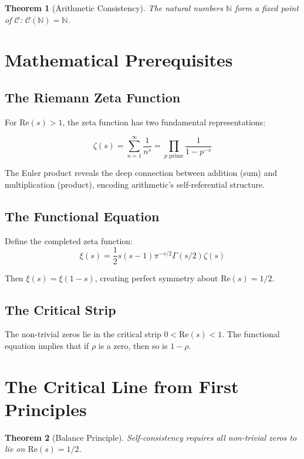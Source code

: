 \documentclass[12pt]{article}
\newtheorem{theorem}{Theorem}[section]
\newcommand{\N}{\mathbb{N}}
\begin{document}
\begin{theorem}[Arithmetic Consistency]
The natural numbers $\N$ form a fixed point of $\mathcal{C}$: $\mathcal{C}(\N) = \N$.
\end{theorem}

\section{Mathematical Prerequisites}

\subsection{The Riemann Zeta Function}

For $\text{Re}(s) > 1$, the zeta function has two fundamental representations:

\begin{equation}
\zeta(s) = \sum_{n=1}^{\infty} \frac{1}{n^s} = \prod_{p \text{ prime}} \frac{1}{1-p^{-s}}
\end{equation}

The Euler product reveals the deep connection between addition (sum) and multiplication (product), encoding arithmetic's self-referential structure.

\subsection{The Functional Equation}

Define the completed zeta function:
\begin{equation}
\xi(s) = \frac{1}{2}s(s-1)\pi^{-s/2}\Gamma(s/2)\zeta(s)
\end{equation}

Then $\xi(s) = \xi(1-s)$, creating perfect symmetry about $\text{Re}(s) = 1/2$.

\subsection{The Critical Strip}

The non-trivial zeros lie in the critical strip $0 < \text{Re}(s) < 1$. The functional equation implies that if $\rho$ is a zero, then so is $1-\rho$.

\section{The Critical Line from First Principles}

\begin{theorem}[Balance Principle]
Self-consistency requires all non-trivial zeros to lie on $\text{Re}(s) = 1/2$.
\end{theorem}
\end{document}
